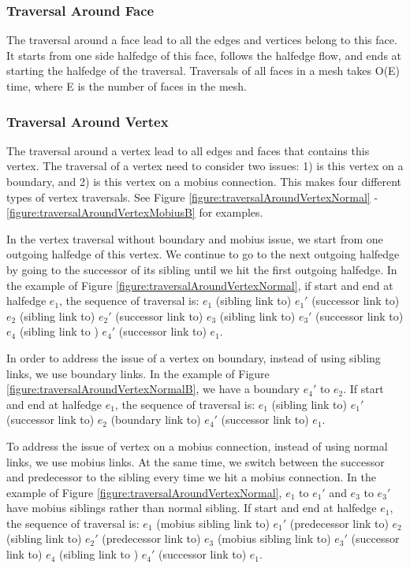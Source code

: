 \documentclass[12pt]{article}
\begin{document}
\subsubsection{Traversal Around Face}
The traversal around a face lead to all the edges and vertices belong to this face. It starts from one side halfedge of this face, follows the halfedge flow, and ends at starting the halfedge of the traversal.
Traversals of all faces in a mesh takes O(E) time, where E is the number of faces in the mesh.

\subsubsection{Traversal Around Vertex}
The traversal around a vertex lead to all edges and faces that contains this vertex. The traversal of a vertex need to consider two issues: 1) is this vertex on a boundary, and  2) is this vertex on a mobius connection. This makes four different types of vertex traversals. See Figure \ref{figure:traversalAroundVertexNormal} - \ref{figure:traversalAroundVertexMobiusB} for examples.

In the vertex traversal without boundary and mobius issue, we start from one outgoing halfedge of this vertex. We continue to go to the next outgoing halfedge by going to the successor of its sibling until we hit the first outgoing halfedge. In the example of Figure \ref{figure:traversalAroundVertexNormal}, if start and end at halfedge $e_1$, the sequence of traversal is: $e_1$ (sibling link to) $e_1'$ (successor link to) $e_2$ (sibling link to) $e_2'$ (successor link to) $e_3$ (sibling link to) $e_3'$ (successor link to) $e_4$ (sibling link to ) $e_4'$  (successor link to)  $e_1$.

In order to address the issue of a vertex on boundary, instead of using sibling links, we use boundary links. In the example of Figure \ref{figure:traversalAroundVertexNormalB}, we have a boundary $e_4'$ to $e_2$. If start and end at halfedge $e_1$, the sequence of traversal is: $e_1$ (sibling link to) $e_1'$ (successor link to) $e_2$ (boundary link to) $e_4'$ (successor link to)  $e_1$.

To address the issue of vertex on a mobius connection, instead of using normal links, we use mobius links. At the same time, we switch between the successor and predecessor to the sibling every time we hit a mobius connection.  In the example of Figure \ref{figure:traversalAroundVertexNormal}, $e_1$ to $e_1'$ and $e_3$ to $e_3'$ have mobius siblings rather than normal sibling. If start and end at halfedge $e_1$, the sequence of traversal is: $e_1$ (mobius sibling link to) $e_1'$ (predecessor link to) $e_2$ (sibling link to) $e_2'$ (predecessor link to) $e_3$ (mobius sibling link to) $e_3'$ (successor link to) $e_4$ (sibling link to ) $e_4'$  (successor link to)  $e_1$.
\end{document}
